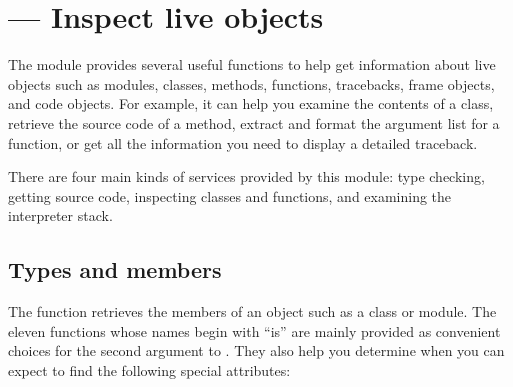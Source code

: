 \section{ ---
         Inspect live objects}



The  module provides several useful functions
to help get information about live objects such as modules,
classes, methods, functions, tracebacks, frame objects, and
code objects.  For example, it can help you examine the
contents of a class, retrieve the source code of a method,
extract and format the argument list for a function, or
get all the information you need to display a detailed traceback.

There are four main kinds of services provided by this module:
type checking, getting source code, inspecting classes
and functions, and examining the interpreter stack.

\subsection{Types and members
            \label{inspect-types}}

The  function retrieves the members
of an object such as a class or module.
The eleven functions whose names begin with ``is'' are mainly
provided as convenient choices for the second argument to
.  They also help you determine when
you can expect to find the following special attributes:


